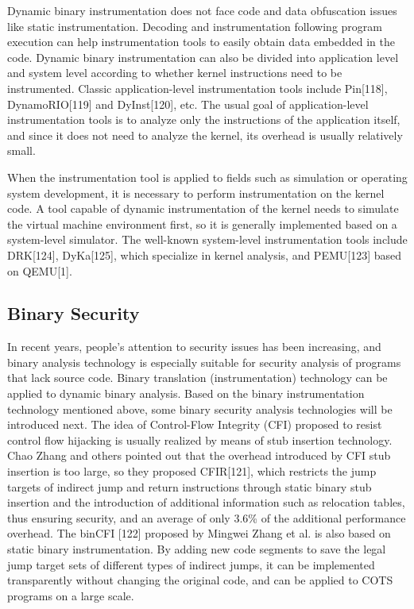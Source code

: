 Dynamic binary instrumentation does not face code and data obfuscation issues like static instrumentation.
Decoding and instrumentation following program execution can help instrumentation tools to easily obtain data embedded in the code.
Dynamic binary instrumentation can also be divided into application level and system level according to whether kernel instructions need to be instrumented.
Classic application-level instrumentation tools include Pin[118], DynamoRIO[119] and DyInst[120], etc.
The usual goal of application-level instrumentation tools is to analyze only the instructions of the application itself, and since it does not need to analyze the kernel, its overhead is usually relatively small.

When the instrumentation tool is applied to fields such as simulation or operating system development, it is necessary to perform instrumentation on the kernel code.
A tool capable of dynamic instrumentation of the kernel needs to simulate the virtual machine environment first, so it is generally implemented based on a system-level simulator.
The well-known system-level instrumentation tools include DRK[124], DyKa[125], which specialize in kernel analysis, and PEMU[123] based on QEMU[1].

\subsection{Binary Security}
In recent years, people's attention to security issues has been increasing, and binary analysis technology is especially suitable for security analysis of programs that lack source code.
Binary translation (instrumentation) technology can be applied to dynamic binary analysis.
Based on the binary instrumentation technology mentioned above, some binary security analysis technologies will be introduced next.
The idea of Control-Flow Integrity (CFI) proposed to resist control flow hijacking is usually realized by means of stub insertion technology.
Chao Zhang and others pointed out that the overhead introduced by CFI stub insertion is too large, so they proposed CFIR[121], which restricts the jump targets of indirect jump and return instructions through static binary stub insertion and the introduction of additional information such as relocation tables, thus ensuring security, and an average of only 3.6\% of the additional performance overhead.
The binCFI [122] proposed by Mingwei Zhang et al. is also based on static binary instrumentation.
By adding new code segments to save the legal jump target sets of different types of indirect jumps, it can be implemented transparently without changing the original code, and can be applied to COTS programs on a large scale.

